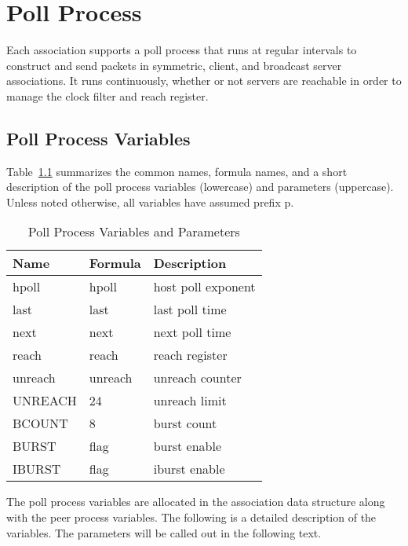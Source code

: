 \chapter{Poll Process}
\label{section-13}

Each association supports a poll process that runs at regular
intervals to construct and send packets in symmetric, client, and
broadcast server associations. It runs continuously, whether or not
servers are reachable in order to manage the clock filter and reach
register.

\section{Poll Process Variables}
\label{section-13-1}

Table~\ref{poll_process_variables_and_parameters} summarizes the common names, formula names, and a short
description of the poll process variables (lowercase) and parameters
(uppercase). Unless noted otherwise, all variables have assumed
prefix p.

\begin{table}[htb]
  \center
  \begin{tabular}{| l | l | l |}
    \hline
    Name    & Formula & Description        \\
    \hline
    \hline
    hpoll   & hpoll   & host poll exponent \\
    last    & last    & last poll time     \\
    next    & next    & next poll time     \\
    reach   & reach   & reach register     \\
    unreach & unreach & unreach counter    \\
    UNREACH & 24      & unreach limit      \\
    BCOUNT  & 8       & burst count        \\
    BURST   & flag    & burst enable       \\
    IBURST  & flag    & iburst enable      \\
    \hline
  \end{tabular}
  \caption{Poll Process Variables and Parameters}
  \label{poll_process_variables_and_parameters}
\end{table}

The poll process variables are allocated in the association data
structure along with the peer process variables. The following is a
detailed description of the variables. The parameters will be called
out in the following text.

